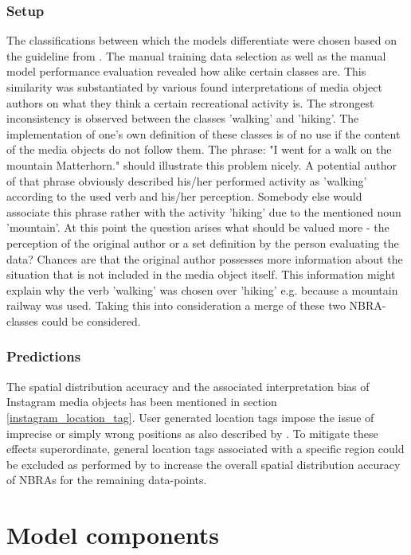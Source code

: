 \subsubsection{Setup} 
The classifications between which the models differentiate were chosen based on the guideline from \textcite{IFL2018}. The manual training data selection as well as the manual model performance evaluation revealed how alike certain classes are. This similarity was substantiated by various found interpretations of media object authors on what they think a certain recreational activity is. The strongest inconsistency is observed between the classes 'walking' and 'hiking'. The implementation of one's own definition of these classes is of no use if the content of the media objects do not follow them. The phrase: "I went for a walk on the mountain Matterhorn." should illustrate this problem nicely. A potential author of that phrase obviously described his/her performed activity as 'walking' according to the used verb and his/her perception. Somebody else would associate this phrase rather with the activity 'hiking' due to the mentioned noun 'mountain'. At this point the question arises what should be valued more - the perception of the original author or a set definition by the person evaluating the data? Chances are that the original author possesses more information about the situation that is not included in the media object itself. This information might explain why the verb 'walking' was chosen over 'hiking' e.g. because a mountain railway was used. 
Taking this into consideration a merge of these two NBRA-classes could be considered.

\subsubsection{Predictions}
The spatial distribution accuracy and the associated interpretation bias of Instagram media objects has been mentioned in section \ref{instagram_location_tag}. User generated location tags impose the issue of imprecise or simply wrong positions as also described by \textcite{Lee2016}. To mitigate these effects superordinate, general location tags associated with a specific region could be excluded as performed by \textcite{Heikinheimo2017} to increase the overall spatial distribution accuracy of NBRAs for the remaining data-points.

\section{Model components} \label{disussion_model_performance}

